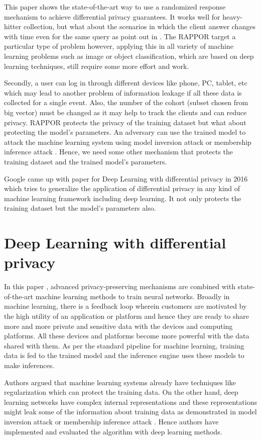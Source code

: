  This paper shows the state-of-the-art way to use a randomized response mechanism to achieve differential privacy guarantees. It works well for heavy-hitter collection, but what about the scenarios in which the client answer changes with time even for the same query as point out in \cite{18}. The RAPPOR target a particular type of problem however, applying this in all variety of machine learning problems such as image or object classification, which are based on deep learning techniques, still require some more effort and work.
 
 Secondly, a user can log in through different devices like phone, PC, tablet, etc which may lead to another problem of information leakage if all these data is collected for a single event. Also, the number of the cohort (subset chosen from big vector) must be changed as it may help to track the clients and can reduce privacy. RAPPOR protects the privacy of the training dataset but what about protecting the model’s parameters. An adversary can use the trained model to attack the machine learning system using model inversion attack \cite{17} or membership inference attack \cite{16}. Hence, we need some other mechanism that protects the training dataset and the trained model’s parameters.

Google came up with paper for Deep Learning with differential privacy \cite{4} in 2016 which tries to generalize the application of differential privacy in any kind of machine learning framework including deep learning. It not only protects the training dataset but the model’s parameters also.
 
\section{Deep Learning with differential privacy}
\label{sec:rwDL}
In this paper \cite{4}, advanced privacy-preserving mechanisms are combined with state-of-the-art machine learning methods to train neural networks. Broadly in machine learning, there is a feedback loop wherein customers are motivated by the high utility of an application or platform and hence they are ready to share more and more private and sensitive data with the devices and computing platforms. All these devices and platforms become more powerful with the data shared with them. As per the standard pipeline for machine learning, training data is fed to the trained model and the inference engine uses these models to make inferences. 

Authors argued that machine learning systems already have techniques like regularization which can protect the training data. On the other hand, deep learning networks have complex internal representations and these representations might leak some of the information about training data as demonstrated in model inversion attack \cite{17} or membership inference attack \cite{16}. Hence authors have implemented and evaluated the algorithm with deep learning methods. 

